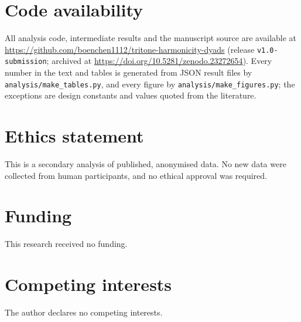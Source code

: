 \documentclass[11pt,a4paper]{article}
\begin{document}
\section*{Code availability}
All analysis code, intermediate results and the manuscript source are available at
\url{https://github.com/boenchen1112/tritone-harmonicity-dyads} (release \texttt{v1.0-submission}; archived at \url{https://doi.org/10.5281/zenodo.23272654}). Every number in
the text and tables is generated from JSON result files by \texttt{analysis/make\_tables.py},
and every figure by \texttt{analysis/make\_figures.py}; the exceptions are design constants and
values quoted from the literature.

\section*{Ethics statement}
This is a secondary analysis of published, anonymised data. No new data were collected from
human participants, and no ethical approval was required.

\section*{Funding}
This research received no funding.

\section*{Competing interests}
The author declares no competing interests.


\end{document}
